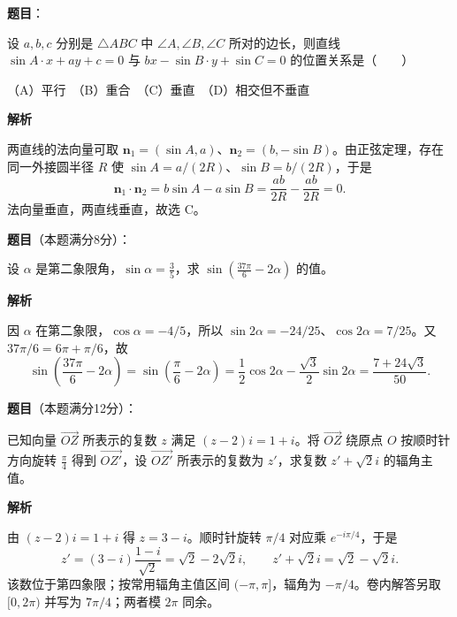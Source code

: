 \begin{answer}

\textbf{题目}：

设 $a,b,c$ 分别是 $\triangle ABC$ 中 $\angle A,\angle B,\angle C$ 所对的边长，则直线 $\sin A\cdot x+ay+c=0$ 与 $bx-\sin B\cdot y+\sin C=0$ 的位置关系是\mbox{（　　）}

（A）平行　（B）重合　（C）垂直　（D）相交但不垂直

\textbf{解析}

两直线的法向量可取 $\boldsymbol n_1=(\sin A,a)$、$\boldsymbol n_2=(b,-\sin B)$。由正弦定理，存在同一外接圆半径 $R$ 使 $\sin A=a/(2R)$、$\sin B=b/(2R)$，于是
\nopagebreak[4]
\[
\boldsymbol n_1\cdot\boldsymbol n_2=b\sin A-a\sin B=\frac{ab}{2R}-\frac{ab}{2R}=0.
\]
法向量垂直，两直线垂直，故选 C。


\end{answer}
\begin{answer}

\textbf{题目}（本题满分8分）：

设 $\alpha$ 是第二象限角，$\sin\alpha=\frac35$，求 $\sin\left(\frac{37\pi}{6}-2\alpha\right)$ 的值。

\textbf{解析}

因 $\alpha$ 在第二象限，$\cos\alpha=-4/5$，所以 $\sin2\alpha=-24/25$、$\cos2\alpha=7/25$。又 $37\pi/6=6\pi+\pi/6$，故
\nopagebreak[4]
\[
\sin\left(\frac{37\pi}{6}-2\alpha\right)=\sin\left(\frac\pi6-2\alpha\right)
=\frac12\cos2\alpha-\frac{\sqrt3}{2}\sin2\alpha
=\frac{7+24\sqrt3}{50}.
\]


\end{answer}
\begin{answer}

\textbf{题目}（本题满分12分）：

已知向量 $\overrightarrow{OZ}$ 所表示的复数 $z$ 满足 $(z-2)i=1+i$。将 $\overrightarrow{OZ}$ 绕原点 $O$ 按顺时针方向旋转 $\frac\pi4$ 得到 $\overrightarrow{OZ'}$，设 $\overrightarrow{OZ'}$ 所表示的复数为 $z'$，求复数 $z'+\sqrt2 i$ 的辐角主值。

\textbf{解析}

由 $(z-2)i=1+i$ 得 $z=3-i$。顺时针旋转 $\pi/4$ 对应乘 $e^{-i\pi/4}$，于是
\nopagebreak[4]
\[
z'=(3-i)\frac{1-i}{\sqrt2}=\sqrt2-2\sqrt2 i,
\qquad z'+\sqrt2 i=\sqrt2-\sqrt2 i.
\]
该数位于第四象限；按常用辐角主值区间 $(-\pi,\pi]$，辐角为 $-\pi/4$。卷内解答另取 $[0,2\pi)$ 并写为 $7\pi/4$；两者模 $2\pi$ 同余。


\end{answer}
